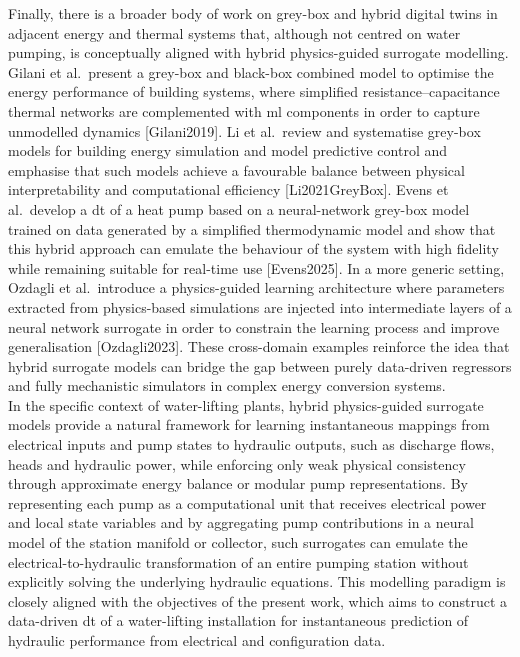 Finally, there is a broader body of work on grey-box and hybrid digital twins in adjacent energy and thermal systems that, although not centred on water pumping, is conceptually aligned with hybrid physics-guided surrogate modelling. Gilani et al.\ present a grey-box and black-box combined model to optimise the energy performance of building systems, where simplified resistance–capacitance thermal networks are complemented with \acrshort{ml} components in order to capture unmodelled dynamics [Gilani2019]. Li et al.\ review and systematise grey-box models for building energy simulation and model predictive control and emphasise that such models achieve a favourable balance between physical interpretability and computational efficiency [Li2021GreyBox]. Evens et al.\ develop a \acrshort{dt} of a heat pump based on a neural-network grey-box model trained on data generated by a simplified thermodynamic model and show that this hybrid approach can emulate the behaviour of the system with high fidelity while remaining suitable for real-time use [Evens2025]. In a more generic setting, Ozdagli et al.\ introduce a physics-guided learning architecture where parameters extracted from physics-based simulations are injected into intermediate layers of a neural network surrogate in order to constrain the learning process and improve generalisation [Ozdagli2023]. These cross-domain examples reinforce the idea that hybrid surrogate models can bridge the gap between purely data-driven regressors and fully mechanistic simulators in complex energy conversion systems.\\

In the specific context of water-lifting plants, hybrid physics-guided surrogate models provide a natural framework for learning instantaneous mappings from electrical inputs and pump states to hydraulic outputs, such as discharge flows, heads and hydraulic power, while enforcing only weak physical consistency through approximate energy balance or modular pump representations. By representing each pump as a computational unit that receives electrical power and local state variables and by aggregating pump contributions in a neural model of the station manifold or collector, such surrogates can emulate the electrical-to-hydraulic transformation of an entire pumping station without explicitly solving the underlying hydraulic equations. This modelling paradigm is closely aligned with the objectives of the present work, which aims to construct a data-driven \acrshort{dt} of a water-lifting installation for instantaneous prediction of hydraulic performance from electrical and configuration data.
